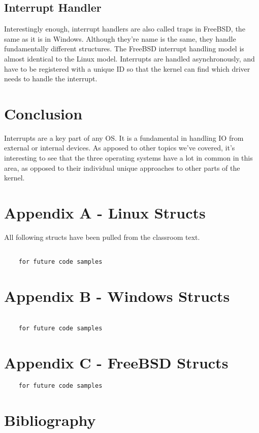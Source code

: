 \documentclass[10pt,letterpaper,onecolumn,draftclsnofoot]{IEEEtran}
\begin{document}
  \subsection{Interrupt Handler}
  Interestingly enough, interrupt handlers are also called traps in FreeBSD, the
  same as it is in Windows. Although they're name is the same, they handle fundamentally
  different structures. The FreeBSD interrupt handling model is almost identical
  to the Linux model. Interrupts are handled asynchronously, and have to be registered
  with a unique ID so that the kernel can find which driver needs to handle the
  interrupt. \cite{freebsd2016}

  \section{Conclusion}

  Interrupts are a key part of any OS. It is a fundamental in handling IO from
  external or internal devices. As apposed to other topics we've covered, it's
  interesting to see that the three operating systems have a lot in common in this
  area, as opposed to their individual unique approaches to other parts of the
  kernel.

  \clearpage
  \section{Appendix A - Linux Structs}
  All following structs have been pulled from the classroom text. \cite{robertlove2010}
  \begin{lstlisting}

    for future code samples

  \end{lstlisting}

  \section{Appendix B - Windows Structs}
  \begin{lstlisting}

    for future code samples
  \end{lstlisting}
  \section{Appendix C - FreeBSD Structs}
  \begin{lstlisting}
    for future code samples

  \end{lstlisting}

  \section{Bibliography}
  
  
\end{document}
